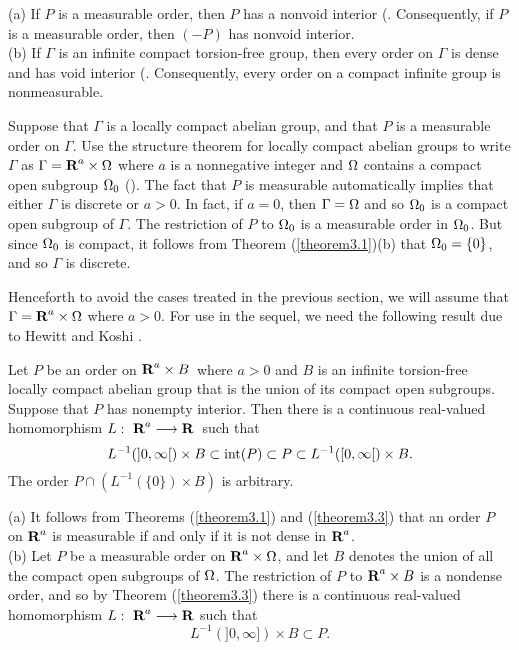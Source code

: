 \begin{theorem3.1}
(a)  If $P$ is a measurable order, then $P$ 
has a nonvoid interior (\cite[Theorem (3.1)]{hk}.
Consequently,  if 
$P$ is a measurable order, then $(-P)$ has nonvoid interior.\\
(b)  If $\Gamma$ is an infinite compact 
torsion-free group, then every 
order on $\Gamma$ is dense and has 
void interior (\cite[Theorem (3.2)]{hk}.  
Consequently, every order on a compact 
infinite group is nonmeasurable.\\
\label{theorem3.1}
\end{theorem3.1}
%
%
%
\begin{remark3.2}
{\rm Suppose that $\Gamma$ is a locally compact 
abelian group, and that $P$ is a 
measurable order on $\Gamma$.  
%
Use the structure theorem for locally 
compact abelian groups to write $\Gamma$ 
as $\Gamma=\R^a\times\O$ where $a$ is a nonnegative
integer and $\Omega$ 
contains a compact open subgroup $\Omega_0$
(\cite[Theorem (24.30)]{hr1}).  
The fact that $P$ is measurable automatically 
implies that either $\Gamma$ is 
discrete or $a>0$. 
%
In fact, if $a=0$, then $\Gamma=\Omega$ and so $\Omega_0$ 
is a compact open 
subgroup of $\Gamma$.  
%
The restriction of $P$ to $\Omega_0$ is 
a measurable order in $\Omega_0$.  
But since $\Omega_0$ is compact, it 
follows from Theorem (\ref{theorem3.1})(b) that $\Omega_0=\{0\}$, 
and so $\Gamma$ is discrete. }  
\label{remark3.2}
\end{remark3.2}
%
%
%
%
 Henceforth to avoid the cases 
 treated in the previous section, 
 we will assume that $\Gamma=\R^a\times\O$ where $a>0$.
 For use in the sequel, we need the following result due to 
 Hewitt and Koshi \cite[Theorem (3.12)]{hk}. %
\begin{theorem3.3}
Let $P$ be an order on $\R^a\times B$\ where 
$a>0$ and $B$ is an infinite torsion-free
locally compact abelian group that is 
the union of its compact open subgroups.  
Suppose that $P$ has nonempty interior.
Then there is a continuous real-valued 
homomorphism $L:\ \R^a\longrightarrow \R$\ such that
\begin{equation}
L^{-1}(] 0,\infty [ )\times B\subset {\rm int} (P) \subset P\subset
L^{-1}([ 0,\infty [ )\times B.
\label{orders-on-R-a}
\end{equation}
The order $P\cap (L^{-1} (\{0\})\times B)$
is arbitrary.  
\label{theorem3.3}
\end{theorem3.3}
%
%
%
%
%
%
%
%
\begin{remarks3.4}
{\rm (a)  It follows from Theorems (\ref{theorem3.1}) and
(\ref{theorem3.3}) that an order 
$P$ on $\R^a$ is measurable if and only if 
it is not dense in $\R^a$.\\
(b)  Let $P$ be a measurable order on $\R^a \times \O$, 
and let $B$ denotes the union of all the compact open
subgroups of $\Omega$. 
The restriction of $P$ to $\R^a \times B$
is a nondense order, and so by
Theorem (\ref{theorem3.3}) there is a
continuous real-valued homomorphism
$L:\ \R^a \longrightarrow \R$ such that
$$ L^{-1} (]0,\infty]) \times B \subset P .$$}
\label{remarks3.4}
\end{remarks3.4}
